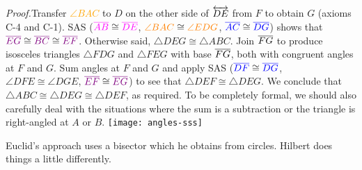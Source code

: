 \begin{tcolorbox}[proofstyle, lower separated=false, sidebyside, sidebyside align=top seam, sidebyside gap=0pt, righthand width=0.4\linewidth]
	\emph{Proof.}\lstsp	Transfer \textcolor{orange}{$\angle BAC$} to $D$ on the other side of $\overleftrightarrow{DE}$ from $F$ to obtain $G$ (axioms C-4 and C-1).\smallbreak
	SAS ($\textcolor{Magenta}{\cl{AB}}\cong\textcolor{Magenta}{\cl{DE}}$, $\textcolor{orange}{\angle BAC}\cong \textcolor{orange}{\angle EDG}$, $\textcolor{blue}{\overline{AC}}\cong\textcolor{blue}{\overline{DG}}$) shows that $\textcolor{violet}{\overline{EG}}\cong\textcolor{violet}{\overline{BC}} \cong \textcolor{violet}{\overline{EF}}$. Otherwise said, $\triangle DEG\cong\triangle ABC$.\smallbreak
	Join $\overline{FG}$ to produce isosceles triangles $\triangle FDG$ and $\triangle FEG$ with base $\overline{FG}$, both with congruent angles at $F$ and $G$.\smallbreak
	Sum angles at $F$ and $G$ and apply SAS ($\textcolor{blue}{\overline{DF}}\cong\textcolor{blue}{\overline{DG}}$, $\angle DFE\cong \angle DGE$, $\textcolor{violet}{\overline{EF}}\cong\textcolor{violet}{\overline{EG}}$) to see that $\triangle DEF\cong\triangle DEG$.\smallbreak
	We conclude that $\triangle ABC\cong\triangle DEG\cong\triangle DEF$, as required.\medbreak
	To be completely formal, we should also carefully deal with the situations where the sum is a subtraction or the triangle is right-angled at $A$ or $B$.
	\tcblower
	\flushright\texttt{[image: angles-sss]}\\[-10pt]\hfill\qedsymbol
\end{tcolorbox}

\goodbreak



Euclid's approach uses a bisector which he obtains from circles. Hilbert does things a little differently.

